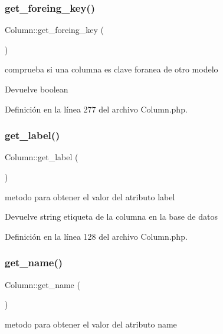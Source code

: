 \subsubsection{\texorpdfstring{get\_foreing\_key()}{get\_foreing\_key()}}
{\footnotesize\ttfamily Column\+::get\+\_\+foreing\+\_\+key (\begin{DoxyParamCaption}{ }\end{DoxyParamCaption})}

comprueba si una columna es clave foranea de otro modelo

\begin{DoxyReturn}{Devuelve}
boolean 
\end{DoxyReturn}


Definición en la línea 277 del archivo Column.\+php.

\mbox{\label{class_column_a119d1743c608b0872a5df560b084ae36}} 
\subsubsection{\texorpdfstring{get\_label()}{get\_label()}}
{\footnotesize\ttfamily Column\+::get\+\_\+label (\begin{DoxyParamCaption}{ }\end{DoxyParamCaption})}

metodo para obtener el valor del atributo label

\begin{DoxyReturn}{Devuelve}
string etiqueta de la columna en la base de datos 
\end{DoxyReturn}


Definición en la línea 128 del archivo Column.\+php.

\mbox{\label{class_column_adb3148efdbf2d710ae3d6617ce16781c}} 
\subsubsection{\texorpdfstring{get\_name()}{get\_name()}}
{\footnotesize\ttfamily Column\+::get\+\_\+name (\begin{DoxyParamCaption}{ }\end{DoxyParamCaption})}

metodo para obtener el valor del atributo name

